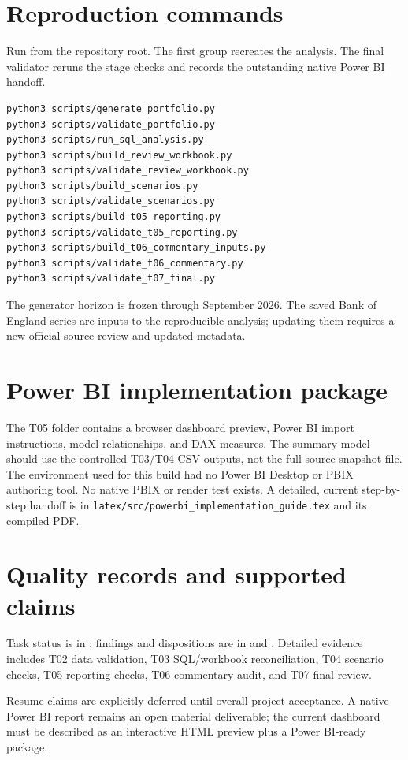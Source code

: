 \documentclass[11pt]{article}
\begin{document}
\section{Reproduction commands}

Run from the repository root. The first group recreates the analysis. The final validator reruns the stage checks and records the outstanding native Power BI handoff.

\begin{lstlisting}
python3 scripts/generate_portfolio.py
python3 scripts/validate_portfolio.py
python3 scripts/run_sql_analysis.py
python3 scripts/build_review_workbook.py
python3 scripts/validate_review_workbook.py
python3 scripts/build_scenarios.py
python3 scripts/validate_scenarios.py
python3 scripts/build_t05_reporting.py
python3 scripts/validate_t05_reporting.py
python3 scripts/build_t06_commentary_inputs.py
python3 scripts/validate_t06_commentary.py
python3 scripts/validate_t07_final.py
\end{lstlisting}

The generator horizon is frozen through September 2026. The saved Bank of England series are inputs to the reproducible analysis; updating them requires a new official-source review and updated metadata.

\section{Power BI implementation package}

The T05 folder contains a browser dashboard preview, Power BI import instructions, model relationships, and DAX measures. The summary model should use the controlled T03/T04 CSV outputs, not the full source snapshot file. The environment used for this build had no Power BI Desktop or PBIX authoring tool. No native PBIX or render test exists. A detailed, current step-by-step handoff is in \texttt{latex/src/powerbi\_implementation\_guide.tex} and its compiled PDF.

\section{Quality records and supported claims}

Task status is in ; findings and dispositions are in  and . Detailed evidence includes T02 data validation, T03 SQL/workbook reconciliation, T04 scenario checks, T05 reporting checks, T06 commentary audit, and T07 final review.

Resume claims are explicitly deferred until overall project acceptance. A native Power BI report remains an open material deliverable; the current dashboard must be described as an interactive HTML preview plus a Power BI-ready package.
\end{document}
